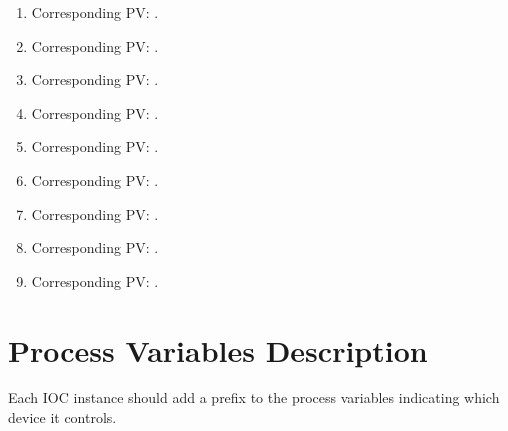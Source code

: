 \documentclass[openany]{article}
\begin{document}
        \begin{enumerate}
            \item \textbf{} Corresponding PV: \hyperlink{pv:}{}.
            \item \textbf{} Corresponding PV: \hyperlink{pv:}{}.
            \item \textbf{} Corresponding PV: \hyperlink{pv:}{}.
            \item \textbf{} Corresponding PV: \hyperlink{pv:}{}.
            \item \textbf{} Corresponding PV: \hyperlink{pv:}{}.
            \item \textbf{} Corresponding PV: \hyperlink{pv:}{}.
            \item \textbf{} Corresponding PV: \hyperlink{pv:}{}.
            \item \textbf{} Corresponding PV: \hyperlink{pv:}{}.
            \item \textbf{} Corresponding PV: \hyperlink{pv:}{}.
        \end{enumerate}

\newpage
\section{Process Variables Description}\label{sec:process-variables}

    Each IOC instance should add a prefix to the process variables indicating which device it controls.
\end{document}
